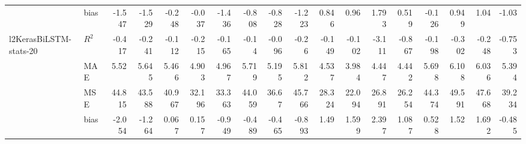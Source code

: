 \begin{tabular}{p{1.5cm}lrrrrrrrrrrrrrrrr}
                        & bias  & -1.547 & -1.529 & -0.248 & -0.037 & -1.436 & -0.808 & -0.828 & -1.223 &  0.846 &  0.96  &  1.793 &  0.519 & -0.126 &  0.949 &  1.04  & -1.03  \\
 l2KerasBiLSTM-stats-20 & $R^2$ & -0.417 & -0.241 & -0.112 & -0.215 & -0.165 & -0.14  & -0.096 & -0.26  & -0.149 & -0.102 & -3.111 & -0.867 & -0.198 & -0.302 & -0.248 & -0.753 \\
                        & MAE   &  5.52  &  5.645 &  5.466 &  4.903 &  4.967 &  5.719 &  5.195 &  5.812 &  4.537 &  3.984 &  4.447 &  4.442 &  5.698 &  6.108 &  6.036 &  5.394 \\
                        & MSE   & 44.815 & 43.588 & 40.967 & 32.196 & 33.363 & 44.059 & 36.67  & 45.766 & 28.324 & 22.094 & 26.891 & 26.254 & 44.374 & 49.591 & 47.668 & 39.234 \\
                        & bias  & -2.054 & -1.264 &  0.067 &  0.157 & -0.949 & -0.489 & -0.465 & -0.893 &  1.49  &  1.599 &  2.397 &  1.087 &  0.528 &  1.52  &  1.692 & -0.485 \\
\hline
\end{tabular}